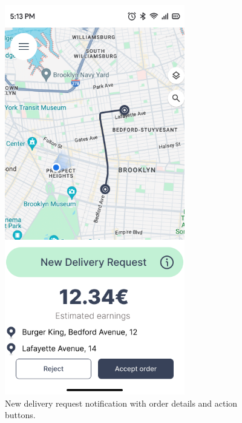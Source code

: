 \documentclass[a4paper,twoside,11pt]{article}
\begin{document}
\begin{figure}[h]
    \centering
    \includegraphics[width=0.7\textwidth]{delivery_request.png}
    \caption{New delivery request notification with order details and action buttons.}
    \label{fig:delivery_request}
\end{figure}
\end{document}
